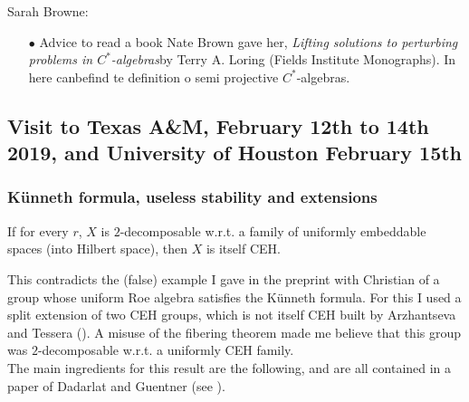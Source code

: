Sarah Browne:

\begin{itemize}
\item[$\bullet$] Advice to read a book Nate Brown gave her, \textit{Lifting solutions to perturbing problems in $C^*$-algebras}by Terry A. Loring (Fields Institute Monographs). In here canbefind te definition o semi projective $C^*$-algebras.
\end{itemize}

\newpage
\subsection{Visit to Texas A\&M, February 12th to 14th 2019, and University of Houston February 15th}

\subsubsection*{K\"{u}nneth formula, useless stability and extensions} 

\begin{prop}
If for every $r$, $X$ is $2$-decomposable w.r.t. a family of uniformly embeddable spaces (into Hilbert space), then $X$ is itself CEH. 
\end{prop}

This contradicts the (false) example I gave in the preprint with Christian of a group whose uniform Roe algebra satisfies the K\"{u}nneth formula. For this I used a split extension of two CEH groups, which is not itself CEH built by Arzhantseva and Tessera (\cite{arzhantseva2016admitting}). A misuse of the fibering theorem made me believe that this group was $2$-decomposable w.r.t. a uniformly CEH family. \\

The main ingredients for this result are the following, and are all contained in a paper of Dadarlat and Guentner (see \cite{dadarlat2007uniform}). 

